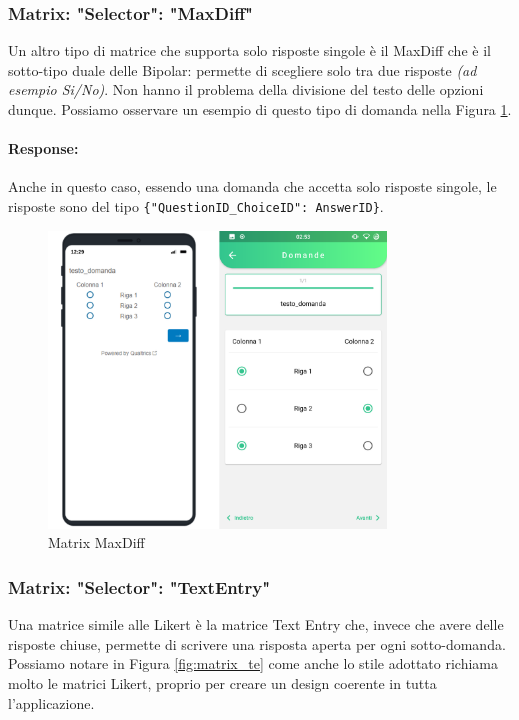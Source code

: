 \clearpage
\subsubsection{Matrix: "Selector": "MaxDiff"}
Un altro tipo di matrice che supporta solo risposte singole è il MaxDiff che è il sotto-tipo duale delle Bipolar: permette di scegliere solo tra due risposte \textit{(ad esempio Si/No)}. Non hanno il problema della divisione del testo delle opzioni dunque. Possiamo osservare un esempio di questo tipo di domanda nella Figura \ref{fig:matrix_maxdiff}.

\paragraph{Response:}
Anche in questo caso, essendo una domanda che accetta solo risposte singole, le risposte sono del tipo \texttt{\{"QuestionID\_ChoiceID": AnswerID\}}.

\begin{figure}[h!]
\centering
\includegraphics[width=0.8\textwidth]{img/matrix_maxdiff}
\caption{Matrix MaxDiff}
\label{fig:matrix_maxdiff}
\end{figure}

\clearpage
\subsubsection{Matrix: "Selector": "TextEntry"}
Una matrice simile alle Likert è la matrice Text Entry che, invece che avere delle risposte chiuse, permette di scrivere una risposta aperta per ogni sotto-domanda. Possiamo notare in Figura \ref{fig:matrix_te} come anche lo stile adottato richiama molto le matrici Likert, proprio per creare un design coerente in tutta l'applicazione.

